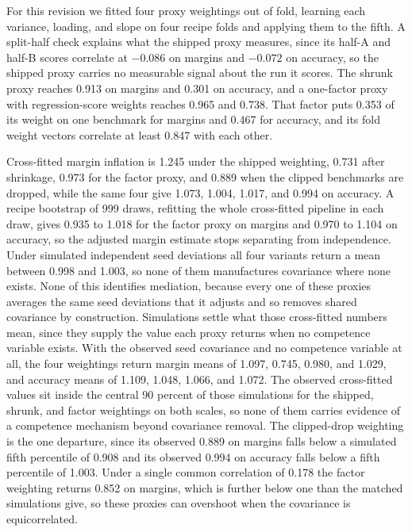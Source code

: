 For this revision we fitted four proxy weightings out of fold, learning each variance, loading, and slope on four recipe folds and applying them to the fifth. A split-half check explains what the shipped proxy measures, since its half-A and half-B scores correlate at $-0.086$ on margins and $-0.072$ on accuracy, so the shipped proxy carries no measurable signal about the run it scores. The shrunk proxy reaches 0.913 on margins and 0.301 on accuracy, and a one-factor proxy with regression-score weights reaches 0.965 and 0.738. That factor puts 0.353 of its weight on one benchmark for margins and 0.467 for accuracy, and its fold weight vectors correlate at least 0.847 with each other.

Cross-fitted margin inflation is 1.245 under the shipped weighting, 0.731 after shrinkage, 0.973 for the factor proxy, and 0.889 when the clipped benchmarks are dropped, while the same four give 1.073, 1.004, 1.017, and 0.994 on accuracy. A recipe bootstrap of 999 draws, refitting the whole cross-fitted pipeline in each draw, gives 0.935 to 1.018 for the factor proxy on margins and 0.970 to 1.104 on accuracy, so the adjusted margin estimate stops separating from independence. Under simulated independent seed deviations all four variants return a mean between 0.998 and 1.003, so none of them manufactures covariance where none exists. None of this identifies mediation, because every one of these proxies averages the same seed deviations that it adjusts and so removes shared covariance by construction. Simulations settle what those cross-fitted numbers mean, since they supply the value each proxy returns when no competence variable exists. With the observed seed covariance and no competence variable at all, the four weightings return margin means of 1.097, 0.745, 0.980, and 1.029, and accuracy means of 1.109, 1.048, 1.066, and 1.072. The observed cross-fitted values sit inside the central 90 percent of those simulations for the shipped, shrunk, and factor weightings on both scales, so none of them carries evidence of a competence mechanism beyond covariance removal. The clipped-drop weighting is the one departure, since its observed 0.889 on margins falls below a simulated fifth percentile of 0.908 and its observed 0.994 on accuracy falls below a fifth percentile of 1.003. Under a single common correlation of 0.178 the factor weighting returns 0.852 on margins, which is further below one than the matched simulations give, so these proxies can overshoot when the covariance is equicorrelated.

